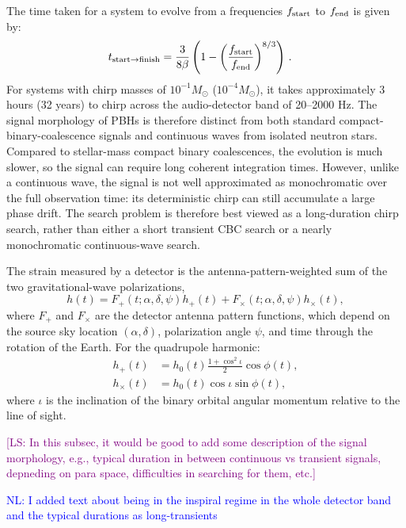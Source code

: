 \documentclass[aps,prd,amsmath,floats,floatfix, twocolumn,
superscriptaddress,nofootinbib,showpacs]{revtex4-2}
\newcommand{\nl}[1]{\textcolor{blue}{NL: #1}}
\newcommand{\ls}[1]{\textcolor{purple}{[LS: #1]}}
\begin{document}
The time taken for a system to evolve from a frequencies $f_{\rm start}$ to $f_{\rm end}$ is given by:
\begin{align}
    t_{\rm start \rightarrow finish} &= \frac{3}{8\beta}\left( 1-\left(\frac{f_{\rm start}}{f_{\rm end}}\right)^{8/3}\right) \, .
\end{align}
For systems with chirp masses of $10^{-1}M_\odot$ ($10^{-4}M_\odot$), it takes approximately 3 hours (32 years) to chirp across the audio-detector band of 20--2000 Hz. The signal morphology of PBHs is therefore distinct from both standard compact-binary-coalescence signals and continuous waves from isolated neutron stars. Compared to stellar-mass compact binary coalescences, the evolution is much slower, so the signal can require long coherent integration times. However, unlike a continuous wave, the signal is not well approximated as monochromatic over the full observation time: its deterministic chirp can still accumulate a large phase drift. The search problem is therefore best viewed as a long-duration chirp search, rather than either a short transient CBC search or a nearly monochromatic continuous-wave search.

The strain measured by a detector is the antenna-pattern-weighted sum of the two gravitational-wave polarizations,
\begin{equation}
    h(t) = F_+(t;\alpha,\delta,\psi) h_+(t) 
    + F_\times(t;\alpha,\delta,\psi) h_\times(t) ,
    \label{eq:detector_response}
\end{equation}
where $F_+$ and $F_\times$ are the detector antenna pattern functions, which depend on the source sky location $(\alpha,\delta)$, polarization angle $\psi$, and time through the rotation of the Earth. For the quadrupole harmonic:
\begin{align}
    h_+(t) &= h_0(t) \frac{1+\cos^2\iota}{2} \cos\phi(t), \\
    h_\times(t) &= h_0(t) \cos\iota \sin\phi(t),
\end{align}
where $\iota$ is the inclination of the binary orbital angular momentum relative to the line of sight.

\ls{In this subsec, it would be good to add some description of the signal morphology, e.g., typical duration in between continuous vs transient signals, depneding on para space, difficulties in searching for them, etc.}

\nl{I added text about being in the inspiral regime in the whole detector band and the typical durations as long-transients}
\end{document}
